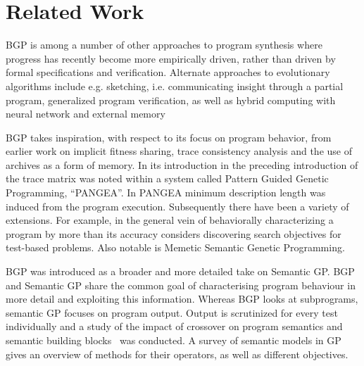 \section{Related Work}
\label{sec:related-work}

BGP is among a number of other approaches to program synthesis where progress has recently become more empirically driven, rather than driven by formal specifications and verification\cite{Basin04synthesisof}.
Alternate approaches to evolutionary algorithms include e.g. sketching\cite{solar2008program}, i.e. communicating insight through a partial program, generalized program verification\cite{srivastava2010program}, as well as hybrid computing with neural network and external memory\cite{graves2016hybrid}

BGP takes inspiration, with respect to its focus on program behavior, from earlier work on implicit fitness
sharing\cite{mckay2000fitness}, trace consistency analysis and the use of archives as a form of memory\cite{haynes1997line}. 
In its introduction in \cite{krawiec2013pattern} the preceding introduction of
the trace matrix was noted within a system called Pattern Guided Genetic Programming, ``PANGEA''. 
In PANGEA  minimum description length was induced from the program execution.
Subsequently there have been a variety of extensions. For example, in the general
vein of behaviorally characterizing a program by more than its
accuracy \cite{liskowski2016online} considers discovering search objectives for test-based
problems. Also notable is Memetic Semantic Genetic
Programming\cite{Ffrancon:2015:MSG:2739480.2754697}.

BGP was introduced as a broader and more detailed take on Semantic GP. BGP and Semantic GP share the common goal of
characterising program behaviour in more detail and exploiting this
information. Whereas BGP looks at subprograms, semantic GP focuses on
program output.  Output is scrutinized for every test individually and a study of the impact of crossover on program semantics
and semantic building blocks~\cite{mcphee2008semantic} was conducted. A survey of
semantic models in GP~\cite{vanneschi2014survey} gives an overview of
methods for their operators, as well as different objectives.

